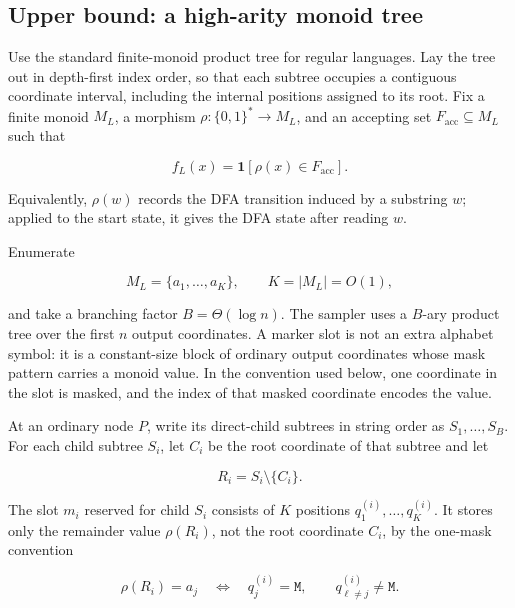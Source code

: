 \documentclass[10pt]{article}
\theoremstyle{definition}
\newcommand{\bits}{\{0,1\}}
\newcommand{\mask}{\mathtt{M}}
\newcommand{\ind}{\mathbf{1}}
\begin{document}
\subsection{Upper bound: a high-arity monoid tree}

Use the standard finite-monoid product tree for regular languages.  Lay the
tree out in depth-first index order, so that each subtree occupies a
contiguous coordinate interval, including the internal positions assigned to
its root.  Fix a finite monoid $M_L$, a morphism
$\rho:\bits^*\to M_L$, and an accepting set $F_{\mathrm{acc}}\subseteq M_L$
such that

\begin{equation}
 f_L(x)=\ind[\rho(x)\in F_{\mathrm{acc}}].
\end{equation}

Equivalently, $\rho(w)$ records the DFA transition induced by a substring
$w$; applied to the start state, it gives the DFA state after reading $w$.

Enumerate

\begin{equation}
 M_L=\{a_1,\ldots,a_K\},\qquad K=|M_L|=O(1),
\end{equation}

and take a branching factor $B=\Theta(\log n)$.  The sampler uses a $B$-ary
product tree over the first $n$ output coordinates.  A marker slot is not an
extra alphabet symbol: it is a constant-size block of ordinary output
coordinates whose mask pattern carries a monoid value.  In the convention
used below, one coordinate in the slot is masked, and the index of that
masked coordinate encodes the value.

At an ordinary node $P$, write its direct-child subtrees in string order as
$S_1,\ldots,S_B$.  For each child subtree $S_i$, let $C_i$ be the root
coordinate of that subtree and let

\begin{equation}
 R_i=S_i\setminus\{C_i\}.
\end{equation}

The slot $m_i$ reserved for child $S_i$ consists of $K$ positions
$q^{(i)}_1,\ldots,q^{(i)}_K$.  It stores only the remainder value
$\rho(R_i)$, not the root coordinate $C_i$, by the one-mask convention

\begin{equation}
 \rho(R_i)=a_j
 \quad\Longleftrightarrow\quad
 q^{(i)}_j=\mask,\qquad q^{(i)}_{\ell\ne j}\ne\mask.
\end{equation}
\end{document}
